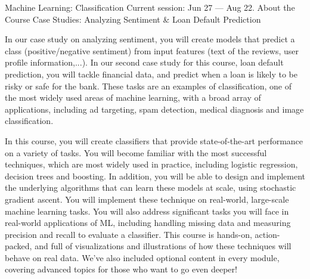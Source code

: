 Machine Learning: Classification
Current session: Jun 27 — Aug 22.
About the Course
Case Studies: Analyzing Sentiment & Loan Default Prediction

In our case study on analyzing sentiment, you will create models that predict a class (positive/negative sentiment) from input features (text of the reviews, user profile information,...).  In our second case study for this course, loan default prediction, you will tackle financial data, and predict when a loan is likely to be risky or safe for the bank. These tasks are an examples of classification, one of the most widely used areas of machine learning, with a broad array of applications, including ad targeting, spam detection, medical diagnosis and image classification. 

In this course, you will create classifiers that provide state-of-the-art performance on a variety of tasks.  You will become familiar with  the most successful techniques, which are most widely used in practice, including logistic regression, decision trees and boosting.  In addition, you will be able to design and implement the underlying algorithms that can learn these models at scale, using stochastic gradient ascent.  You will implement these technique on real-world, large-scale machine learning tasks.  You will also address significant tasks you will face in real-world applications of ML, including handling missing data and measuring precision and recall to evaluate a classifier.  This course is hands-on, action-packed, and full of visualizations and illustrations of how these techniques will behave on real data.  We've also included optional content in every module, covering advanced topics for those who want to go even deeper! 

